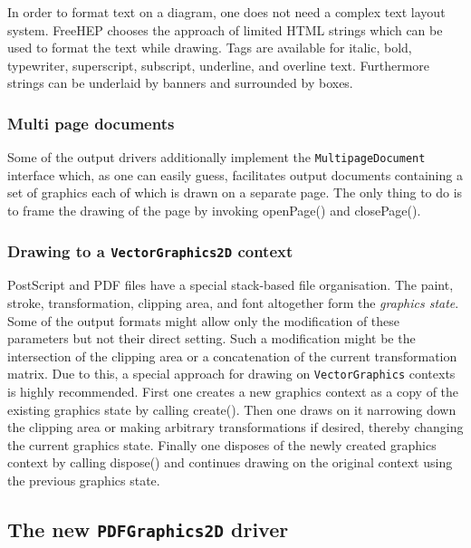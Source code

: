 \documentclass[a4paper]{article}
\newcommand{\freehep}{\textsf{FreeHEP}}
\newcommand{\class}[1]{\texttt{#1}}
\newcommand{\fhclass}[1]{\class{#1}}
\newcommand{\method}[1]{\textsf{#1}}
\newcommand{\techterm}[1]{\textit{#1}}
\newcommand{\ps}{PostScript}
\newcommand{\pdf}{PDF}
\begin{document}
In order to format text on a diagram, one does not need a complex text
layout system. \freehep{} chooses the approach of limited HTML strings
which can be used to format the text while drawing. Tags are available
for italic, bold, typewriter, superscript, subscript, underline, and
overline text. Furthermore strings can be underlaid by banners and
surrounded by boxes.

\subsubsection{Multi page documents}

Some of the output drivers additionally implement the
\fhclass{MultipageDocument} interface which, as one can easily guess,
facilitates output documents containing a set of graphics each of which
is drawn on a separate page. The only thing to do is to frame the drawing
of the page by invoking \method{openPage()} and \method{closePage()}.

\subsubsection{Drawing to a \fhclass{VectorGraphics2D} context}

\ps{} and \pdf{} files have a special stack-based file organisation. The
paint, stroke, transformation, clipping area, and font altogether form
the \techterm{graphics state}. Some of the output formats might
allow only the modification of these parameters but not their direct
setting. Such a modification might be the intersection of the clipping
area or a concatenation of the current transformation matrix.  
Due to this, a special approach for drawing on \fhclass{VectorGraphics}
contexts is highly recommended.
\label{createdispose}
First one creates a new graphics context as a copy of the existing
graphics state by calling \method{create()}. Then one draws on it
narrowing down the clipping area or making arbitrary transformations
if desired, thereby changing the current graphics state. Finally one
disposes of the newly created graphics context by calling
\method{dispose()} and continues drawing on the original context using
the previous graphics state.



\subsection{The new \fhclass{PDFGraphics2D} driver}
\label{pdfg2d}
\end{document}

